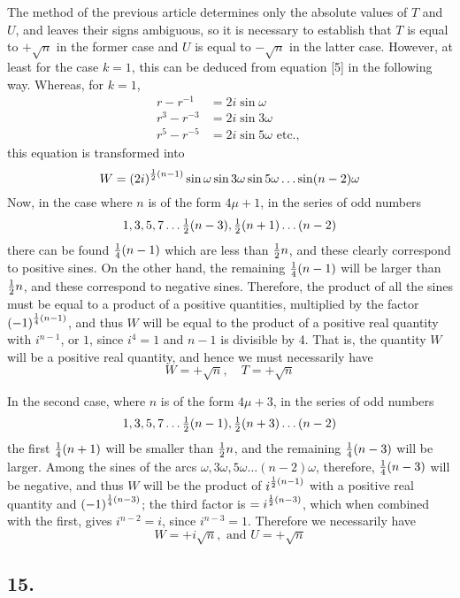 \documentclass[twoside,12pt]{memoir}
\let\oldfrac\frac
\def\frac#1#2{\mathchoice{\tfrac{#1}{#2}}{\oldfrac{#1}{#2}}{\genfrac{}{}{}{2}{#1}{#2\mathstrut}}{\genfrac{}{}{}{3}{#1}{#2\mathstrut}}}
\begin{document}
The method of the previous article determines only the absolute values of \(T\) and \(U\), and leaves their signs ambiguous, so it is necessary to establish that \(T\) is equal to \(+\sqrt{n}\) in the former case and \(U\) is equal to \(-\sqrt{n}\) in the latter case. However, at least for the case \(k=1\), this can be deduced from equation [5] in the following way.  Whereas, for \(k=1\),\pagebreak%
\[\begin{aligned}
r-r^{-1} & =2 i \sin \omega \\
r^{3}-r^{-3} & =2 i \sin 3 \omega \\
r^{5}-r^{-5} & =2 i \sin 5 \omega \text{ etc{.}, }
\end{aligned}\]
this equation is transformed into
\[W=(2 i)^{\frac{1}{2}(n-1)} \sin \omega \sin 3 \omega \sin 5 \omega \ldots \sin (n-2) \omega\]
Now, in the case where \(n\) is of the form \(4 \mu+1\), in the series of odd numbers
\[1,3,5,7 \ldots \frac{1}{2}(n-3), \frac{1}{2}(n+1) \ldots(n-2)\]
there can be found \(\frac{1}{4}(n-1)\) which are less than \(\frac{1}{2} n\), and these clearly correspond to positive sines. On the other hand, the remaining \(\frac{1}{4}(n-1)\) will be larger than \(\frac{1}{2} n\), and these correspond to negative sines. Therefore, the product of all the sines must be equal to a product of a positive quantities, multiplied by the factor \((-1)^{\frac{1}{4}(n-1)}\), and thus \(W\) will be equal to the product of a positive real quantity with \(i^{n-1}\), or \(1\), since \(i^{4}=1\) and \(n-1\) is divisible by 4. That is, the quantity \(W\) will be a positive real quantity, and hence we must necessarily have
\[W=+\sqrt{n}, \quad T=+\sqrt{n}\]

In the second case, where \(n\) is of the form \(4 \mu+3\), in the series of odd numbers
\[1,3,5,7 \ldots \frac{1}{2}(n-1), \frac{1}{2}(n+3) \ldots(n-2)\]
the first \(\frac{1}{4}(n+1)\) will be smaller than \(\frac{1}{2} n\), and the remaining \(\frac{1}{4}(n-3)\) will be larger. Among the sines of the arcs \(\omega, 3 \omega, 5 \omega \ldots(n-2) \omega\), therefore, \(\frac{1}{4}(n-3)\) will be negative, and thus \(W\) will be the product of \(i^{\frac{1}{2}(n-1)}\) with a positive real quantity and \((-1)^{\frac{1}{4}(n-3)}\); the third factor is \(=i^{\frac{1}{2}(n-3)}\), which when combined with the first, gives \(i^{n-2}=i\), since \(i^{n-3}=1\). Therefore we necessarily have
\[W=+i \sqrt{n}, \text{ and } U=+\sqrt{n}\]

\subsection*{15.}
\end{document}
